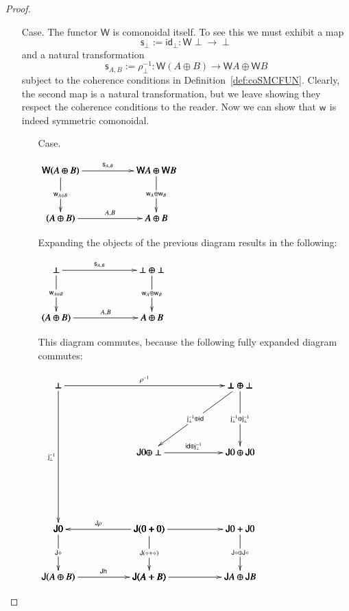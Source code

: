 \documentclass{lmcs}
\let\mto\to
\let\to\relax
\newcommand{\to}{\rightarrow}
\let\r\relax
\let\j\relax
\let\wn\relax
\let\H\relax
\newcommand{\func}[1]{\mathsf{#1}}
\newcommand{\H}[0]{\func{H}}
\newcommand{\J}[0]{\func{J}}
\newcommand{\id}[0]{\mathsf{id}}
\newcommand{\h}[1]{\mathsf{h}_{#1}}
\newcommand{\r}[1]{\mathsf{r}_{#1}}
\newcommand{\s}[1]{\mathsf{s}_{#1}}
\newcommand{\w}[1]{\mathsf{w}_{#1}}
\newcommand{\j}[1]{\mathsf{j}_{#1}}
\newcommand{\jinv}[1]{\mathsf{j}^{-1}_{#1}}
\newcommand{\wn}[0]{\mathop{?}}
\newenvironment{diagram}{
  \begin{center}
    \begin{math}
      \bfig
}{
      \efig
    \end{math}
  \end{center}
}
\begin{document}
\begin{proof}
\begin{itemize}
  \item[Case.] The functor $\func{W}$ is comonoidal itself.  To see this we
    must exhibit a map
    \[\s{\perp} := \id_\perp : \func{W}\perp \mto \perp\]
    and a natural transformation
    \[\s{A,B} := \rho^{-1}_\perp : \func{W}(A \oplus B) \mto \func{W}A \oplus \func{W}B\]
    subject to the coherence conditions in
    Definition~\ref{def:coSMCFUN}.  Clearly, the second map is a natural
    transformation, but we leave showing they respect the coherence
    conditions to the reader.  Now we can show that $\w{}$ is indeed
    symmetric comonoidal.
    \begin{itemize}
    \item[Case.] \ \\
      \begin{diagram}
        \square|amma|<1000,500>[
          \func{W}(A \oplus B)`
          \func{W}A \oplus \func{W}B`
          \wn (A \oplus B)`
          \wn A \oplus \wn B;
          \s{A,B}`
          \w{A \oplus B}`
          \w{A} \oplus \w{B}`
          \r{A,B}]
      \end{diagram}
      Expanding the objects of the previous diagram results in the
      following:
      \begin{diagram}
        \square|amma|<1000,500>[
          \perp`
          \perp \oplus \perp`
          \wn (A \oplus B)`
          \wn A \oplus \wn B;
          \s{A,B}`
          \w{A \oplus B}`
          \w{A} \oplus \w{B}`
          \r{A,B}]
      \end{diagram}
      This diagram commutes, because the following fully expanded
      diagram commutes:
      \begin{diagram}
        \square|amma|/<-`->`->`->/<950,500>[
          \J 0`
          \J (0 + 0)`
          \J\H (A \oplus B)`
          \J (\H A + \H B);
          \J\rho`
          \J\diamond`
          \J (\diamond + \diamond)`
          \J\h{}]

        \square(950, 0)|amma|/->``->`->/<950,500>[
          \J (0 + 0)`
          \J 0 + \J 0`
          \J (\H A + \H B)`
          \J\H A \oplus \J\H B;
          \j{}``
          \J\diamond \oplus \J\diamond`
          \j{}]

        \square(0,500)/->`->``/<1900,1500>[
          \perp`
          \perp \oplus \perp`
          \J 0`;
          \rho^{-1}`
          \jinv{\perp}``]

        \dtriangle(950,1300)|mma|<950,700>[
          \perp \oplus \perp`
          \J 0 \oplus \perp`
          \J 0 \oplus \J 0;
          \jinv{\perp} \oplus \id`
          \jinv{\perp} \oplus \jinv{\perp}`
          \id \oplus \jinv{\perp}]


\end{diagram}
\end{itemize}
\end{itemize}
\end{proof}
\end{document}
